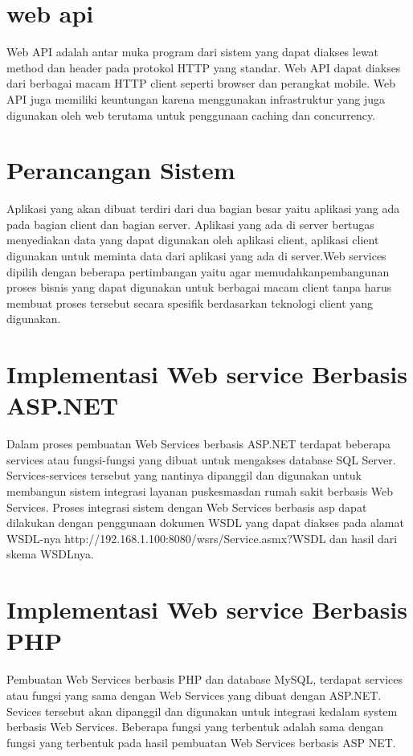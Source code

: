 \section{web api}
Web API adalah antar muka program dari sistem yang dapat diakses lewat method dan
header pada protokol HTTP yang standar. Web API dapat diakses dari berbagai macam HTTP
client seperti browser dan perangkat mobile. Web API juga memiliki keuntungan karena
menggunakan infrastruktur yang juga digunakan oleh web terutama untuk penggunaan caching
dan concurrency.


\section{Perancangan Sistem}
Aplikasi yang akan dibuat terdiri dari dua bagian besar yaitu aplikasi yang ada pada bagian client dan bagian server. 
Aplikasi yang ada di server bertugas menyediakan data yang dapat digunakan oleh aplikasi client, aplikasi client digunakan
untuk meminta data dari aplikasi yang ada di server.Web services dipilih dengan beberapa pertimbangan yaitu agar 
memudahkanpembangunan proses bisnis yang dapat digunakan untuk berbagai macam client tanpa harus membuat proses 
tersebut secara spesifik berdasarkan teknologi client yang digunakan.


\section{Implementasi Web service Berbasis ASP.NET}
Dalam proses pembuatan Web Services berbasis ASP.NET terdapat beberapa services atau fungsi-fungsi
yang dibuat untuk mengakses database SQL Server. Services-services tersebut yang nantinya dipanggil 
dan digunakan untuk membangun sistem integrasi layanan puskesmasdan rumah sakit berbasis Web Services.
Proses integrasi sistem dengan Web Services berbasis asp dapat dilakukan dengan penggunaan dokumen WSDL
yang dapat diakses pada alamat WSDL-nya http://192.168.1.100:8080/wsrs/Service.asmx?WSDL dan hasil dari skema WSDLnya.


\section{Implementasi Web service Berbasis PHP}
Pembuatan Web Services berbasis PHP dan database MySQL, terdapat  services atau fungsi yang sama 
dengan Web Services yang dibuat dengan ASP.NET. Sevices tersebut akan dipanggil dan digunakan untuk 
integrasi kedalam system berbasis Web Services. Beberapa fungsi yang terbentuk adalah sama dengan fungsi 
yang terbentuk pada hasil pembuatan Web Services berbasis ASP NET.


